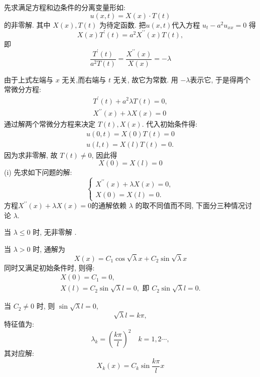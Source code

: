 \begin{questions}
\begin{solution}
\end{solution}
\begin{solution}
    先求满足方程和边条件的分离变量形如:
$$
u(x, t)=X(x) \cdot T(t)
$$
的非零解. 其中 $ X(x), T(t) $ 为待定函数.
把$u(x,t)$代入方程 $u_{t}-a^{2} u_{x x}=0$  得
$$
X(x) T^{\prime}(t)=a^{2} X^{\prime \prime}(x) T(t),
$$
即 
$$\frac{T^{\prime}(t)}{a^{2} T(t)}=\frac{X^{\prime \prime}(x)}{X(x)}=-\lambda $$

由于上式左端与 $ x $ 无关,而右端与 $ t $ 无关, 故它为常数. 用 $ -\lambda $表示它, 于是得两个常微分方程:
$$
\begin{array}{c}
T^{\prime}(t)+a^{2} \lambda T(t)=0, \\
X^{\prime \prime}(x)+\lambda X(x)=0
\end{array}
$$
通过解两个常微分方程来决定 $ T(t), X(x) $.  代入初始条件得:
$$
\begin{array}{l}
u(0, t)=X(0) T(t)=0 \\
u(l, t)=X(l) T(t)=0 .
\end{array}
$$
因为求非零解, 故 $ T(t) \neq 0 $, 因此得
$$
X(0)=X(l)=0
$$
(i) 先求如下问题的解:
$$
\left\{\begin{array}{l}
X^{\prime \prime}(x)+\lambda X(x)=0, \\
X(0)=X(l)=0 .
\end{array}\right.
$$
方程$X^{\prime \prime}(x)+\lambda X(x)=0$的通解依赖 $ \lambda $ 的取不同值而不同, 下面分三种情况讨论 $ \lambda $.

当 $ \lambda \leqslant 0 $ 时, 无非零解 .

当 $ \lambda>0 $ 时, 通解为
$$
X(x)=C_{1} \cos \sqrt{\lambda} x+C_{2} \sin \sqrt{\lambda} x
$$
同时又满足初始条件时, 则得:
$$
\begin{array}{c}
X(0)=C_{1}=0, \\
X(l)=C_{2} \sin \sqrt{\lambda} l=0, \text { 即 } C_{2} \sin \sqrt{\lambda} l=0 .
\end{array}
$$

当 $ C_{2} \neq 0 $ 时, 则 $ \sin \sqrt{\lambda} l=0 $,
$$
\sqrt{\lambda} l=k \pi,
$$
特征值为:
$$
\lambda_{k}=\left(\frac{k \pi}{l}\right)^{2} \quad k=1,2 \cdots,
$$
其对应解:
$$
X_{k}(x)=C_{k} \sin \frac{k \pi}{l} x 
$$


\end{solution}
\end{questions}

